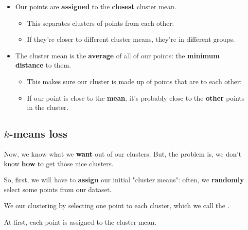         \begin{itemize}
            \item Our points are \textbf{assigned} to the \textbf{closest} cluster mean.
            
                \begin{itemize}
                    \item This separates  clusters of points from each other:

                    \item If they're closer to different cluster means, they're in different groups.
                \end{itemize}
            
            \item The cluster mean is the \textbf{average} of all of our points: the \textbf{minimum distance} to them.
            
                \begin{itemize}
                    \item This makes sure our cluster is made up of points that are  to each other:
                    
                    \item If our point is close to the \textbf{mean}, it's probably close to the \textbf{other} points in the cluster.
                \end{itemize}
        \end{itemize}
        
    \subsection{$k$-means loss}
    
        Now, we know what we \textbf{want} out of our clusters. But, the problem is, we don't know \textbf{how} to get those nice clusters.
        
        So, first, we will have to \textbf{assign} our initial "cluster means": often, we \textbf{randomly} select some points from our dataset.\\
        
        \begin{concept}
            We  our clustering by  selecting one point to  each cluster, which we call the .
            
            At first, each point is assigned to the  cluster mean.
        \end{concept}
        
